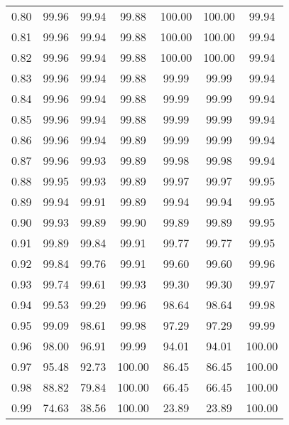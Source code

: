 \begin{tabular}{|c|c|c|c|c|c|c|}
      0.80 &     99.96 &     99.94 &      99.88 &  100.00 &     100.00 &         99.94 \\
      0.81 &     99.96 &     99.94 &      99.88 &  100.00 &     100.00 &         99.94 \\
      0.82 &     99.96 &     99.94 &      99.88 &  100.00 &     100.00 &         99.94 \\
      0.83 &     99.96 &     99.94 &      99.88 &   99.99 &      99.99 &         99.94 \\
      0.84 &     99.96 &     99.94 &      99.88 &   99.99 &      99.99 &         99.94 \\
      0.85 &     99.96 &     99.94 &      99.88 &   99.99 &      99.99 &         99.94 \\
      0.86 &     99.96 &     99.94 &      99.89 &   99.99 &      99.99 &         99.94 \\
      0.87 &     99.96 &     99.93 &      99.89 &   99.98 &      99.98 &         99.94 \\
      0.88 &     99.95 &     99.93 &      99.89 &   99.97 &      99.97 &         99.95 \\
      0.89 &     99.94 &     99.91 &      99.89 &   99.94 &      99.94 &         99.95 \\
      0.90 &     99.93 &     99.89 &      99.90 &   99.89 &      99.89 &         99.95 \\
      0.91 &     99.89 &     99.84 &      99.91 &   99.77 &      99.77 &         99.95 \\
      0.92 &     99.84 &     99.76 &      99.91 &   99.60 &      99.60 &         99.96 \\
      0.93 &     99.74 &     99.61 &      99.93 &   99.30 &      99.30 &         99.97 \\
      0.94 &     99.53 &     99.29 &      99.96 &   98.64 &      98.64 &         99.98 \\
      0.95 &     99.09 &     98.61 &      99.98 &   97.29 &      97.29 &         99.99 \\
      0.96 &     98.00 &     96.91 &      99.99 &   94.01 &      94.01 &        100.00 \\
      0.97 &     95.48 &     92.73 &     100.00 &   86.45 &      86.45 &        100.00 \\
      0.98 &     88.82 &     79.84 &     100.00 &   66.45 &      66.45 &        100.00 \\
      0.99 &     74.63 &     38.56 &     100.00 &   23.89 &      23.89 &        100.00 \\
\bottomrule
\end{tabular}

